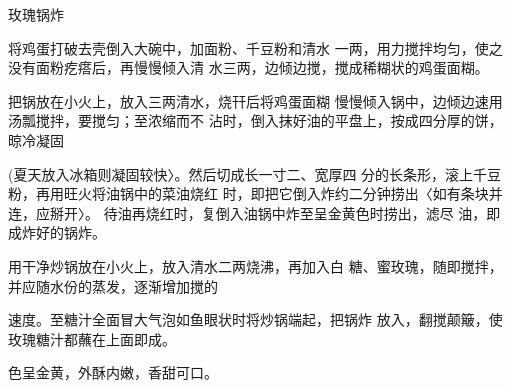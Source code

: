 \begin{recipe}{玫瑰锅炸}

\ingredients



\cooking

\step 	将鸡蛋打破去壳倒入大碗中，加面粉、千豆粉和清水 一两，用力搅拌均匀，使之没有面粉疙瘩后，再慢慢倾入清 水三两，边倾边搅，搅成稀糊状的鸡蛋面糊。

\step 	把锅放在小火上，放入三两清水，烧幵后将鸡蛋面糊 慢慢倾入锅中，边倾边速用汤瓢搅拌，要搅匀；至浓缩而不 沾时，倒入抹好油的平盘上，按成四分厚的饼，晾冷凝固

(夏天放入冰箱则凝固较快〉。然后切成长一寸二、宽厚四 分的长条形，滚上千豆粉，再用旺火将油锅中的菜油烧红 时，即把它倒入炸约二分钟捞出〈如有条块并连，应掰开〉。 待油再烧红时，复倒入油锅中炸至呈金黄色时捞出，滤尽 油，即成炸好的锅炸。

\step 用干净炒锅放在小火上，放入清水二两烧沸，再加入白 糖、蜜玫瑰，随即搅拌，并应随水份的蒸发，逐渐增加搅的

速度。至糖汁全面冒大气泡如鱼眼状时将炒锅端起，把锅炸 放入，翻搅颠簸，使玫瑰糖汁都蘸在上面即成。

\notes

色呈金黄，外酥内嫩，香甜可口。

\end{recipe}

